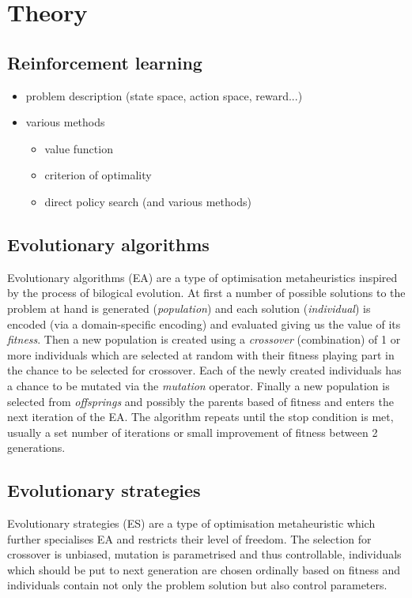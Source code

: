 \chapter{Theory}
\label{chap:theory}

\section{Reinforcement learning}
\label{sec:reinf}
\begin{itemize}
    \item problem description (state space, action space, reward...)
    \item various methods \begin{itemize}
        \item value function
        \item criterion of optimality
        \item direct policy search (and various methods)
    \end{itemize}
\end{itemize}
\section{Evolutionary algorithms}
\label{sec:ea}
Evolutionary algorithms (EA) are a type of optimisation metaheuristics inspired by the process of bilogical evolution. At first a number of possible solutions to the problem at hand is generated (\emph{population}) and each solution (\emph{individual}) is encoded (via a domain-specific encoding) and evaluated giving us the value of its \emph{fitness}. Then a new population is created using a \emph{crossover} (combination) of 1 or more individuals which are selected at random with their fitness playing part in the chance to be selected for crossover. Each of the newly created individuals has a chance to be mutated via the \emph{mutation} operator. Finally a new population is selected from \emph{offsprings} and possibly the parents based of fitness and enters the next iteration of the EA. The algorithm repeats until the stop condition is met, usually a set number of iterations or small improvement of fitness between 2 generations. \cite{Rudolph2012} \cite{Vikhar2016} 
\section{Evolutionary strategies}
\label{sec:es}
Evolutionary strategies (ES) are a type of optimisation metaheuristic which further specialises EA and restricts their level of freedom. The selection for crossover is unbiased, mutation is parametrised and thus controllable, individuals which should be put to next generation are chosen ordinally based on fitness and individuals contain not only the problem solution but also control parameters.

